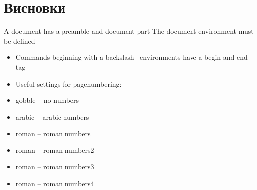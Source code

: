 
\section*{Висновки}

A document has a preamble and document part
The document environment must be defined
\begin{itemize}
	\item Commands beginning with a backslash \, environments have a begin and end tag
	\item Useful settings for pagenumbering:
	\item gobble – no numbers
	\item arabic – arabic numbers
	\item roman – roman numbers
	\item roman – roman numbers2
	\item roman – roman numbers3
	\item roman – roman numbers4
\end{itemize}
